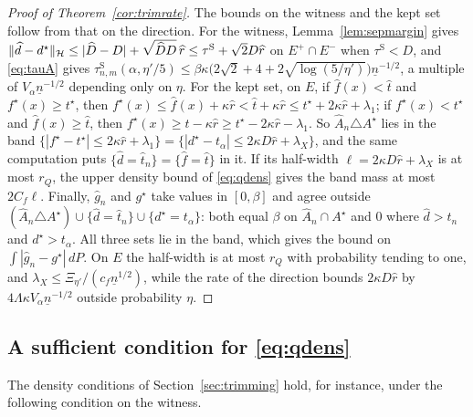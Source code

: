 \begin{proof}[Proof of Theorem~\ref{cor:trimrate}]
The bounds on the witness and the kept set follow from that on the direction. For the witness, Lemma~\ref{lem:sepmargin} gives $\|\widehat d-d^\star\|_{\mathcal{H}}\le|\widehat
D-D|+\sqrt{\widehat DD}\,\widehat r\le\tau^{\mathrm S}+\sqrt2D\widehat r$ on $E^+\cap E^-$ when $\tau^{\mathrm S}<D$, and \eqref{eq:tauA} gives
$\tau^{\mathrm S}_{n,m}(\alpha,\eta'/5)\le\beta\kappa\big(2\sqrt2+4+2\sqrt{\log(5/\eta')}\big)\underline n^{-1/2}$, a multiple of $V_\alpha\underline n^{-1/2}$ depending only on $\eta$. For the kept set, on $E$, if $\widehat f(x)<\widehat t$ and $f^\star(x)\ge t^\star$, then
$f^\star(x)\le\widehat f(x)+\kappa\widehat r<\widehat t+\kappa\widehat r\le t^\star+2\kappa\widehat r+\lambda_1$; if
$f^\star(x)<t^\star$ and $\widehat f(x)\ge\widehat t$, then $f^\star(x)\ge\widehat t-\kappa\widehat r\ge
t^\star-2\kappa\widehat r-\lambda_1$. So $\widehat A_n\triangle A^\star$ lies in the band
$\{|f^\star-t^\star|\le2\kappa\widehat r+\lambda_1\}=\{|d^\star-t_\alpha|\le2\kappa D\widehat r+\lambda_X\}$, and the same computation puts $\{\widehat d=\widehat t_n\}=
\{\widehat f=\widehat t\}$ in it. If its half-width $\ell=2\kappa D\widehat r+\lambda_X$ is at most $r_Q$, the upper density bound of
\eqref{eq:qdens} gives the band mass at most $2C_f\ell$. Finally, $\widehat g_n$ and $g^\star$ take values in
$[0,\beta]$ and agree outside $(\widehat A_n\triangle A^\star)\cup\{\widehat d=\widehat t_n\}\cup\{d^\star=t_\alpha\}$:
both equal $\beta$ on $\widehat A_n\cap A^\star$ and $0$ where $\widehat d>\widehat t_n$ and $d^\star>t_\alpha$. All three
sets lie in the band, which gives the bound on $\int|\widehat g_n-g^\star|\,dP$. On $E$ the half-width is at most $r_Q$ with probability tending to one, and
$\lambda_X\le\Xi_{\eta'}/(c_f\underline n^{1/2})$, while the rate of the direction bounds $2\kappa D\widehat r$ by
$4\Lambda\kappa V_\alpha\underline n^{-1/2}$
outside probability $\eta$.
\end{proof}

\subsection{A sufficient condition for \eqref{eq:qdens}}

The density conditions of Section~\ref{sec:trimming} hold, for instance, under the following condition on the witness.


